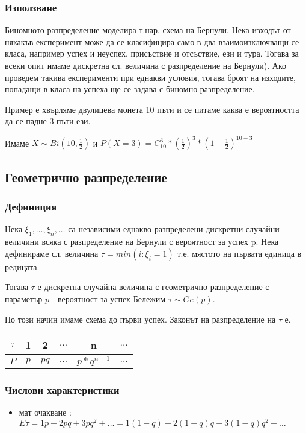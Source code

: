 \documentclass[fleqn,12pt]{article}
\begin{document}
\begin{justify}
\subsubsection{Използване} 
Биномното разпределение моделира т.нар. схема на Бернули. Нека изходът от някакъв експеримент може да се класифицира
само в два взаимоизключващи се класа, например успех и неуспех, присъствие и отсъствие, ези и тура. Тогава за всеки опит
имаме дискретна сл. величина с разпределение на Бернули). Ако проведем такива експерименти при еднакви условия, тогава 
броят на изходите, попадащи в класа на успеха ще се задава с биномно разпределение.

Пример е хвърляме двулицева монета 10 пъти и се питаме каква е вероятността да се падне 3 пъти ези. 

Имаме $X \sim Bi(10, \frac{1}{2})$ и $P(X=3) = C_{10}^3 * (\frac{1}{2})^3 * (1 - \frac{1}{2})^{10-3}$

\subsection{Геометрично разпределение}
\subsubsection{Дефиниция} 
Нека $\xi_1, \dots, \xi_n, \dots$ са независими еднакво разпределени дискретни случайни величини всяка с разпределение 
на Бернули с вероятност за успех p.
Нека дефинираме сл. величина $\tau = min(i : \xi_i = 1)$ т.е. мястото на първата единица в редицата. 

Тогава $\tau$ е 
дискретна случайна величина с геометрично разпределение с параметър $p$ - вероятност за успех Бележим $\tau \sim Ge(p)$.

По този начин имаме схема до първи успех. Законът на разпределение на $\tau$ е.

\begin{tabular}{|c|c|c|c|c|c|}
    \hline
    $\tau$ & 1 & 2 & $\dots$ & n & $\dots$ \\
    \hline
    $P$ & $p$ & $pq$ & $\dots$ & $p * q^{n-1}$ & $\dots$ \\
    \hline
\end{tabular}

\subsubsection{Числови характеристики} 
\begin{itemize}
    \item мат очакване : $E\tau = 1p + 2pq + 3pq^2 + \dots = 1(1 - q) + 2(1-q)q + 3(1-q)q^2 + \dots $


\end{itemize}
\end{justify}
\end{document}
